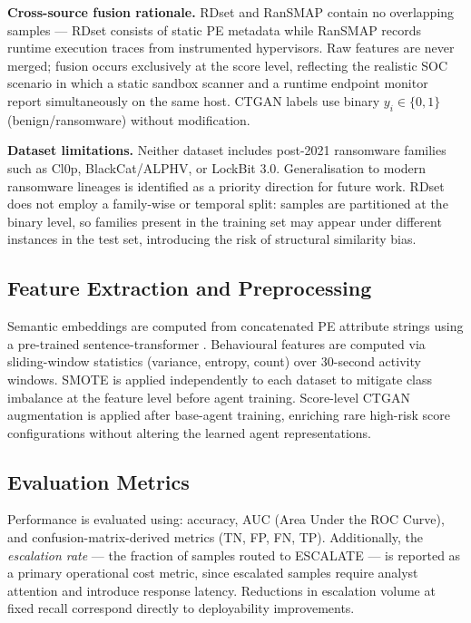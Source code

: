 \textbf{Cross-source fusion rationale.} RDset and RanSMAP contain no overlapping samples — RDset consists of static PE metadata while RanSMAP records runtime execution traces from instrumented hypervisors. Raw features are never merged; fusion occurs exclusively at the score level, reflecting the realistic SOC scenario in which a static sandbox scanner and a runtime endpoint monitor report simultaneously on the same host. CTGAN labels use binary $y_i \in \{0, 1\}$ (benign/ransomware) without modification.

\textbf{Dataset limitations.} Neither dataset includes post-2021 ransomware families such as Cl0p, BlackCat/ALPHV, or LockBit 3.0. Generalisation to modern ransomware lineages is identified as a priority direction for future work. RDset does not employ a family-wise or temporal split: samples are partitioned at the binary level, so families present in the training set may appear under different instances in the test set, introducing the risk of structural similarity bias.

\subsection{Feature Extraction and Preprocessing}

Semantic embeddings are computed from concatenated PE attribute strings using a pre-trained sentence-transformer \cite{ReimersG19}. Behavioural features are computed via sliding-window statistics (variance, entropy, count) over 30-second activity windows. SMOTE \cite{chawla2002smote} is applied independently to each dataset to mitigate class imbalance at the feature level before agent training. Score-level CTGAN augmentation is applied after base-agent training, enriching rare high-risk score configurations without altering the learned agent representations.

\subsection{Evaluation Metrics}

Performance is evaluated using: accuracy, AUC (Area Under the ROC Curve), and confusion-matrix-derived metrics (TN, FP, FN, TP). Additionally, the \emph{escalation rate} — the fraction of samples routed to ESCALATE — is reported as a primary operational cost metric, since escalated samples require analyst attention and introduce response latency. Reductions in escalation volume at fixed recall correspond directly to deployability improvements.


